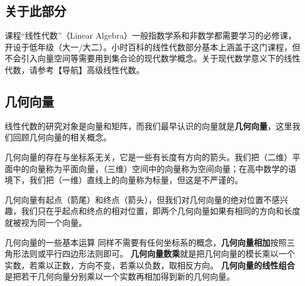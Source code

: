 
\begin{issues}
\issueDraft
\end{issues}


\subsection{关于此部分}

课程“线性代数”（Linear Algebra）一般指数学系和非数学都需要学习的必修课，开设于低年级（大一/大二）。小时百科的线性代数部分基本上涵盖于这门课程，但不会引入向量空间等需要用到集合论的现代数学概念。关于现代数学意义下的线性代数，请参考【导航】高级线性代数。

\subsection{几何向量}

线性代数的研究对象是向量和矩阵，而我们最早认识的向量就是\textbf{几何向量}，这里我们回顾几何向量的相关概念。

几何向量的存在与坐标系无关，它是一些有长度有方向的箭头。我们把（二维）平面中的向量称为平面向量，（三维）空间中的向量称为空间向量；在高中数学的语境下，我们把（一维）直线上的向量称为标量，但这是不严谨的。



几何向量有起点（箭尾）和终点（箭头），但我们对几何向量的绝对位置不感兴趣，我们只在乎起点和终点的相对位置，即两个几何向量如果有相同的方向和长度就被视为同一个向量。

几何向量的一些基本运算 同样不需要有任何坐标系的概念，\textbf{几何向量相加}按照三角形法则或平行四边形法则即可。
\textbf{几何向量数乘}就是把几何向量的模长乘以一个实数，若乘以正数，方向不变，若乘以负数，取相反方向。 \textbf{几何向量的线性组合}是把若干几何向量分别乘以一个实数再相加得到新的几何向量。

